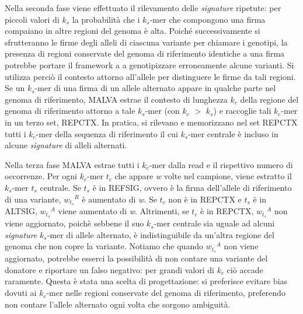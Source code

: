 \documentclass[../main.tex]{subfiles}
\begin{document}
Nella seconda fase viene effettuato il rilevamento delle \textit{signature} ripetute: per piccoli valori di  \textit{${k}_{s}$} la probabilità che i  \textit{${k}_{s}$}-mer che compongono una firma compaiano in altre regioni del genoma è alta. Poiché successivamente si sfrutteranno le firme degli alleli di ciascuna variante per chiamare i genotipi, la presenza di regioni conservate del genoma di riferimento identiche a una firma potrebbe portare il framework a a genotipizzare erroneamente alcune varianti. Si utilizza perciò il contesto attorno all'allele per distinguere le firme da tali regioni. Se un  \textit{${k}_{s}$}-mer di una firma di un allele alternato appare in qualche parte nel genoma di riferimento, MALVA estrae il contesto di lunghezza  \textit{${k}_{c}$} della regione del genoma di riferimento attorno a tale  \textit{${k}_{s}$}-mer (con  \textit{${k}_{c}$} $>$  \textit{${k}_{s}$}) e raccoglie tali  \textit{${k}_{c}$}-mer in un terzo set, REPCTX. In pratica, si rilevano e memorizzano nel set REPCTX  tutti i  \textit{${k}_{c}$}-mer della sequenza di riferimento il cui \textit{${k}_{s}$}-mer centrale è incluso in alcune \textit{signature} di alleli alternati. 

Nella terza fase MALVA estrae tutti i  \textit{${k}_{c}$}-mer dalla read e il rispettivo numero di occorrenze. Per ogni  \textit{${k}_{c}$}-mer  \textit{${t}_{c}$} che appare \textit{w} volte nel campione, viene estratto il  \textit{${k}_{s}$}-mer  \textit{${t}_{s}$} centrale. Se  \textit{${t}_{s}$} è in REFSIG, ovvero è la firma dell'allele di riferimento di una variante, \textit{${w_{{t}_{s}}}^{R}$} è aumentato di \textit{w}. Se  \textit{${t}_{c}$} non è in REPCTX e  \textit{${t}_{s}$} è in ALTSIG, \textit{${w_{{t}_{s}}}^{A}$} viene aumentato di \textit{w}. Altrimenti, se  \textit{${t}_{c}$} è in REPCTX, \textit{${w_{{t}_{s}}}^{A}$} non viene aggiornato, poichè sebbene il suo \textit{${k}_{s}$}-mer centrale sia uguale ad alcuni \textit{signature}  \textit{${k}_{s}$}-mer di allele alternato, è indistinguibile da un'altra regione del genoma che non copre la variante. Notiamo che quando \textit{${w_{{t}_{s}}}^{A}$} non viene aggiornato, potrebbe esserci la possibilità di non contare una variante del donatore e riportare un falso negativo: per grandi valori di  \textit{${k}_{c}$} ciò accade raramente. Questa è stata una scelta di progettazione: si preferisce evitare bias dovuti ai  \textit{${k}_{c}$}-mer nelle regioni conservate del genoma di riferimento, preferendo non contare l'allele alternato ogni volta che sorgono ambiguità.
\end{document}
